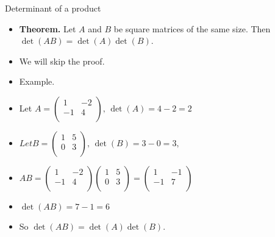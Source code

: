 \documentclass{beamer}
\begin{document}

\begin{frame}{Determinant of a product}
\begin{itemize}
\item \textbf{Theorem.} Let $A$ and $B$ be square matrices of the same size. Then $\det(AB) = \det(A) \det(B)$.
\item We will skip the proof.
\item Example.
\item Let
$
A =
\begin{pmatrix}
1 & -2 \\
-1 & 4 \\
\end{pmatrix}
\text{, }
\det(A) = 4-2=2
$
\item
$ Let
B =
\begin{pmatrix}
1 & 5 \\
0 & 3 \\
\end{pmatrix}
\text{, }
\det(B) = 3 - 0 = 3,
$
\item
$
AB =
\begin{pmatrix}
1 & -2 \\
-1 & 4 \\
\end{pmatrix}
\begin{pmatrix}
1 & 5 \\
0 & 3 \\
\end{pmatrix}
=
\begin{pmatrix}
1 & -1 \\
-1 & 7 \\
\end{pmatrix}
$
\item $\det(AB) = 7 - 1 = 6$
\item So $\det(AB) = \det(A) \det(B).
$
\end{itemize}
\end{frame}




\end{document}
